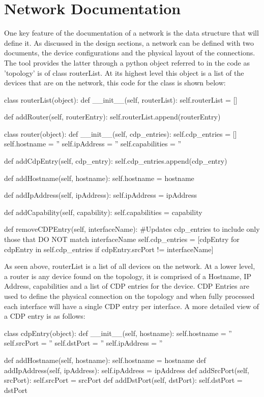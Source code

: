 \documentclass[11pt]{report}
\begin{document}
\section{Network Documentation}

One key feature of the documentation of a network is the data structure that will define it. As discussed in the design sections, a network can be defined with two documents, the device configurations and the physical layout of the connections. The tool provides the latter through a python object referred to in the code as 'topology' is of class routerList. At its highest level this object is a list of the devices that are on the network, this code for the class is shown below:

\begin{python}
	class routerList(object):
		def __init__(self, routerList):
			self.routerList = []
	
		def addRouter(self, routerEntry):
			self.routerList.append(routerEntry)
	
	class router(object):
		def __init__(self, cdp_entries):
			self.cdp_entries = []
			self.hostname = ''
			self.ipAddress = ''
			self.capabilities = ''
	
		def addCdpEntry(self, cdp_entry):
			self.cdp_entries.append(cdp_entry)
	
		def addHostname(self, hostname):
			self.hostname = hostname
	
		def addIpAddress(self, ipAddress):
			self.ipAddress = ipAddress
	
		def addCapability(self, capability):
			self.capabilities = capability
	
		def removeCDPEntry(self, interfaceName):
			#Updates cdp_entries to include only those that DO NOT match interfaceName
			self.cdp_entries = [cdpEntry for cdpEntry in self.cdp_entries if cdpEntry.srcPort != interfaceName]
\end{python}

As seen above, routerList is a list of all devices on the network. At a lower level, a router is any device found on the topology, it is comprised of a Hostname, IP Address, capabilities and a list of CDP entries for the device. CDP Entries are used to define the physical connection on the topology and when fully processed each interface will have a single CDP entry per interface. A more detailed view of a CDP entry is as follows:

\begin{python}
		class cdpEntry(object):
			def __init__(self, hostname):
				self.hostname = ''
				self.srcPort = ''
				self.dstPort = ''
				self.ipAddress = ''
		
			def addHostname(self, hostname):
				self.hostname = hostname
			def addIpAddress(self, ipAddress):
				self.ipAddress = ipAddress
			def addSrcPort(self, srcPort):
				self.srcPort = srcPort
			def addDstPort(self, dstPort):
				self.dstPort = dstPort
\end{python}
\end{document}
